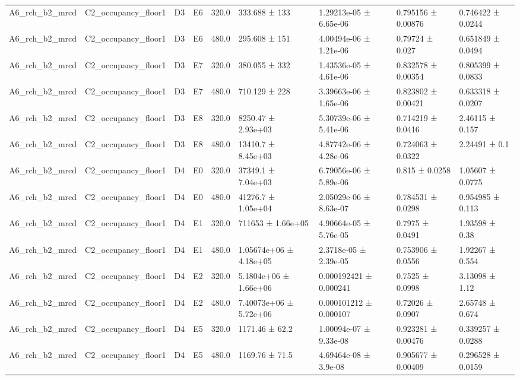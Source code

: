 \begin{table}
\begin{tabular}{lllllllll}
A6\_rch\_b2\_mrcd & C2\_occupancy\_floor1 & D3 & E6 & 320.0 & 333.688 ± 133 & 1.29213e-05 ± 6.65e-06 & 0.795156 ± 0.00876 & 0.746422 ± 0.0244 \\
A6\_rch\_b2\_mrcd & C2\_occupancy\_floor1 & D3 & E6 & 480.0 & 295.608 ± 151 & 4.00494e-06 ± 1.21e-06 & 0.79724 ± 0.027 & 0.651849 ± 0.0494 \\
A6\_rch\_b2\_mrcd & C2\_occupancy\_floor1 & D3 & E7 & 320.0 & 380.055 ± 332 & 1.43536e-05 ± 4.61e-06 & 0.832578 ± 0.00354 & 0.805399 ± 0.0833 \\
A6\_rch\_b2\_mrcd & C2\_occupancy\_floor1 & D3 & E7 & 480.0 & 710.129 ± 228 & 3.39663e-06 ± 1.65e-06 & 0.823802 ± 0.00421 & 0.633318 ± 0.0207 \\
A6\_rch\_b2\_mrcd & C2\_occupancy\_floor1 & D3 & E8 & 320.0 & 8250.47 ± 2.93e+03 & 5.30739e-06 ± 5.41e-06 & 0.714219 ± 0.0416 & 2.46115 ± 0.157 \\
A6\_rch\_b2\_mrcd & C2\_occupancy\_floor1 & D3 & E8 & 480.0 & 13410.7 ± 8.45e+03 & 4.87742e-06 ± 4.28e-06 & 0.724063 ± 0.0322 & 2.24491 ± 0.1 \\
A6\_rch\_b2\_mrcd & C2\_occupancy\_floor1 & D4 & E0 & 320.0 & 37349.1 ± 7.04e+03 & 6.79056e-06 ± 5.89e-06 & 0.815 ± 0.0258 & 1.05607 ± 0.0775 \\
A6\_rch\_b2\_mrcd & C2\_occupancy\_floor1 & D4 & E0 & 480.0 & 41276.7 ± 1.05e+04 & 2.05029e-06 ± 8.63e-07 & 0.784531 ± 0.0298 & 0.954985 ± 0.113 \\
A6\_rch\_b2\_mrcd & C2\_occupancy\_floor1 & D4 & E1 & 320.0 & 711653 ± 1.66e+05 & 4.90664e-05 ± 5.76e-05 & 0.7975 ± 0.0491 & 1.93598 ± 0.38 \\
A6\_rch\_b2\_mrcd & C2\_occupancy\_floor1 & D4 & E1 & 480.0 & 1.05674e+06 ± 4.18e+05 & 2.3718e-05 ± 2.39e-05 & 0.753906 ± 0.0556 & 1.92267 ± 0.554 \\
A6\_rch\_b2\_mrcd & C2\_occupancy\_floor1 & D4 & E2 & 320.0 & 5.1804e+06 ± 1.66e+06 & 0.000192421 ± 0.000241 & 0.7525 ± 0.0998 & 3.13098 ± 1.12 \\
A6\_rch\_b2\_mrcd & C2\_occupancy\_floor1 & D4 & E2 & 480.0 & 7.40073e+06 ± 5.72e+06 & 0.000101212 ± 0.000107 & 0.72026 ± 0.0907 & 2.65748 ± 0.674 \\
A6\_rch\_b2\_mrcd & C2\_occupancy\_floor1 & D4 & E5 & 320.0 & 1171.46 ± 62.2 & 1.00094e-07 ± 9.33e-08 & 0.923281 ± 0.00476 & 0.339257 ± 0.0288 \\
A6\_rch\_b2\_mrcd & C2\_occupancy\_floor1 & D4 & E5 & 480.0 & 1169.76 ± 71.5 & 4.69464e-08 ± 3.9e-08 & 0.905677 ± 0.00409 & 0.296528 ± 0.0159 \\

\end{tabular}
\end{table}
